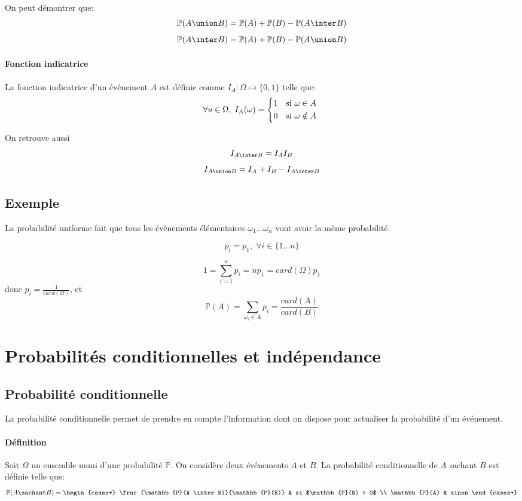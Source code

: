 \documentclass[a4paper,10pt,french,openany]{memoir}
\newcommand{\Proba}{\mathbb{P}}
\begin{document}
On peut démontrer que:
\[ \Proba(A \union B) = \Proba(A) + \Proba(B) - \Proba(A \inter B) \]
\[ \Proba(A \inter B) = \Proba(A) + \Proba(B) - \Proba(A \union B) \]

\paragraph{Fonction indicatrice} La fonction indicatrice d'un événement $A$ est définie comme
$ I_A: \Omega \mapsto \lbrace 0, 1 \rbrace $
telle que:
\[
\forall u \in \Omega, \; I_A(\omega) = \begin{cases*}
1 & si $\omega \in A$ \\ 
0 & si $\omega \notin A$
\end{cases*}
\]

On retrouve aussi
\[I_{A \inter B} = I_A I_B\]
\[I_{A \union B} = I_A + I_B - I_{A \inter B}\]

\subsection{Exemple}

La probabilité uniforme fait que tous les événements élémentaires $\omega_1\dots\omega_n$ vont avoir la même probabilité.

\[ p_i = p_1, \; \forall i \in \lbrace 1 \dots n \rbrace \]

\[ 1 = \sum_{i=1}^n p_i = n p_1 = card(\Omega) p_1 \]
donc $p_i = \frac{1}{card(\Omega)}$, et
\[ \Proba(A) = \sum_{\omega_i \in A} p_i = \frac{card(A)}{card(B)} \]

\section{Probabilités conditionnelles et indépendance}
\subsection{Probabilité conditionnelle}

La probabilité conditionnelle permet de prendre en compte l'information dont on dispose pour actualiser la probabilité d'un événement.

\paragraph{Définition}
Soit $\Omega$ un ensemble muni d'une probabilité $\Proba$. On considère deux événements $A$ et $B$. La probabilité conditionnelle de $A$ sachant $B$ est définie telle que:
\[
\Proba(A \sachant B) =
    \begin{cases*}
        \frac{\Proba(A \inter B)}{\Proba(B)} & si $\Proba(B) > 0$ \\
        \Proba(A) & sinon
    \end{cases*}
\]
\end{document}
